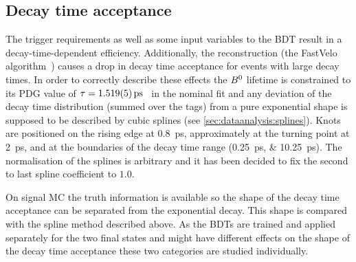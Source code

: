 \subsection{Decay time acceptance}
\label{sec:b02dd:decaytimefit:acceptance}

The trigger requirements as well as some input variables to the BDT result in
a decay-time-dependent efficiency. Additionally, the \velo reconstruction
(\ie the FastVelo algorithm~\cite{Callot:2011bza}) causes a drop in decay time
acceptance for events with large decay times. In order to correctly describe
these effects the ${{B}^0}$ lifetime is constrained to its PDG value of $\tau =
\SI{1.519\pm0.005}{\ps}$~\cite{PDG2014} in the nominal fit and any deviation
of the decay time distribution (summed over the tags) from a pure exponential
shape is supposed to be described by cubic splines (see
\cref{sec:dataanalysis:splines}). Knots are positioned on the rising edge at
\SI{0.8}{\ps}, approximately at the turning point at \SI{2}{\ps}, and at the
boundaries of the decay time range (\SIlist{0.25;10.25}{\ps}). The
normalisation of the splines is arbitrary and it has been decided to fix the
second to last spline coefficient to $\num{1.0}$.

On signal MC the truth information is available so the shape of the decay time
acceptance can be separated from the exponential decay. This shape is compared
with the spline method described above. As the BDTs are trained and applied
separately for the two final states and might have different effects on the
shape of the decay time acceptance these two categories are studied
individually.

